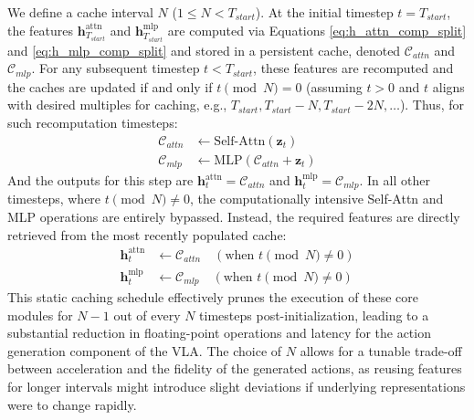 We define a cache interval $N$ ($1 \le N < T_{start}$). At the initial timestep $t=T_{start}$, the features $\mathbf{h}_{T_{start}}^{\text{attn}}$ and $\mathbf{h}_{T_{start}}^{\text{mlp}}$ are computed via Equations \ref{eq:h_attn_comp_split} and \ref{eq:h_mlp_comp_split} and stored in a persistent cache, denoted $\mathcal{C}_{attn}$ and $\mathcal{C}_{mlp}$. For any subsequent timestep $t < T_{start}$, these features are recomputed and the caches are updated if and only if $t \pmod N = 0$ (assuming $t>0$ and $t$ aligns with desired multiples for caching, e.g., $T_{start}, T_{start}-N, T_{start}-2N, \dots$). Thus, for such recomputation timesteps:
\begin{align}
\mathcal{C}_{attn} &\leftarrow \text{Self-Attn}(\mathbf{z}_t) \label{eq:cache_update_attn_split} \\
\mathcal{C}_{mlp} &\leftarrow \text{MLP}(\mathcal{C}_{attn}+\mathbf{z}_t) \label{eq:cache_update_mlp_split} 
\end{align}
And the outputs for this step are $\mathbf{h}_t^{\text{attn}} = \mathcal{C}_{attn}$ and $\mathbf{h}_t^{\text{mlp}} = \mathcal{C}_{mlp}$. In all other timesteps, where $t \pmod N \neq 0$, the computationally intensive Self-Attn and MLP operations are entirely bypassed. Instead, the required features are directly retrieved from the most recently populated cache:
\begin{align}
\mathbf{h}_t^{\text{attn}} &\leftarrow \mathcal{C}_{attn} \quad (\text{when } t \pmod N \neq 0) \label{eq:cache_reuse_attn_method_split} \\
\mathbf{h}_t^{\text{mlp}} &\leftarrow \mathcal{C}_{mlp} \quad (\text{when } t \pmod N \neq 0) \label{eq:cache_reuse_mlp_method_split}
\end{align}
This static caching schedule effectively prunes the execution of these core modules for $N-1$ out of every $N$ timesteps post-initialization, leading to a substantial reduction in floating-point operations and latency for the action generation component of the VLA. The choice of $N$ allows for a tunable trade-off between acceleration and the fidelity of the generated actions, as reusing features for longer intervals might introduce slight deviations if underlying representations were to change rapidly.
